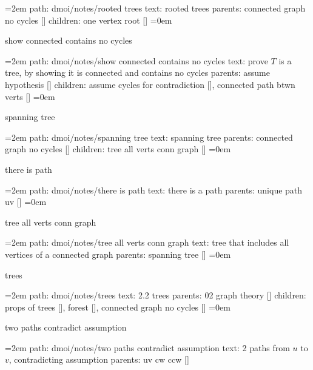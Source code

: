 \smallskip
\par\begingroup
\leftskip=2em
path: dmoi/notes/rooted trees
\smallskip
text:  rooted trees
\smallskip
parents:  connected graph no cycles []
\smallskip
children: one vertex root []
\smallskip
\leftskip=0em
\par\endgroup
\bigskip
{}
show connected contains no cycles
\smallskip
\par\begingroup
\leftskip=2em
path: dmoi/notes/show connected contains no cycles
\smallskip
text:  prove $T$ is a tree, by showing it is connected and contains no cycles
\smallskip
parents:  assume hypothesis []
\smallskip
children: assume cycles for contradiction [], connected path btwn verts []
\smallskip
\leftskip=0em
\par\endgroup
\bigskip
{}
spanning tree
\smallskip
\par\begingroup
\leftskip=2em
path: dmoi/notes/spanning tree
\smallskip
text:  spanning tree
\smallskip
parents:  connected graph no cycles []
\smallskip
children: tree all verts conn graph []
\smallskip
\leftskip=0em
\par\endgroup
\bigskip
{}
there is path
\smallskip
\par\begingroup
\leftskip=2em
path: dmoi/notes/there is path
\smallskip
text:  there is a path
\smallskip
parents:  unique path uv []
\smallskip
\leftskip=0em
\par\endgroup
\bigskip
{}
tree all verts conn graph
\smallskip
\par\begingroup
\leftskip=2em
path: dmoi/notes/tree all verts conn graph
\smallskip
text:  tree that includes all vertices of a connected graph
\smallskip
parents:  spanning tree []
\smallskip
\leftskip=0em
\par\endgroup
\bigskip
{}
trees
\smallskip
\par\begingroup
\leftskip=2em
path: dmoi/notes/trees
\smallskip
text:  2.2 trees
\smallskip
parents:  02 graph theory []
\smallskip
children: props of trees [], forest [], connected graph no cycles []
\smallskip
\leftskip=0em
\par\endgroup
\bigskip
{}
two paths contradict assumption
\smallskip
\par\begingroup
\leftskip=2em
path: dmoi/notes/two paths contradict assumption
\smallskip
text:  2 paths from $u$ to $v$, contradicting assumption
\smallskip
parents:  uv cw ccw []
\smallskip
